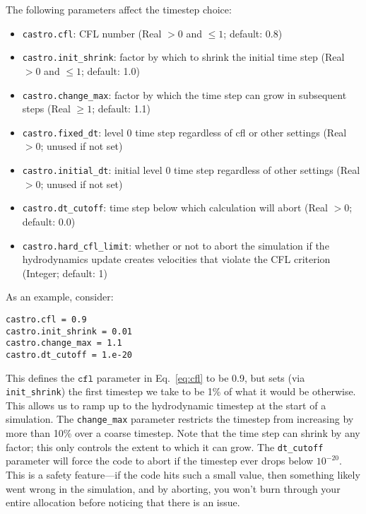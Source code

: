 The following parameters affect the timestep choice:
\begin{itemize}
\item {\tt castro.cfl}: CFL number (Real $> 0$ and $\leq 1$; default: 0.8)

\item {\tt castro.init\_shrink}: factor by which to shrink the initial
   time step (Real $> 0$ and $\leq 1$; default: 1.0)

\item {\tt castro.change\_max}: factor by which the time step can grow in
   subsequent steps (Real $\geq 1$; default: 1.1)

\item {\tt castro.fixed\_dt}: level 0 time step regardless of cfl or other settings
   (Real $> 0$; unused if not set)

\item {\tt castro.initial\_dt}: initial level 0 time
   step regardless of other settings (Real $> 0$;  unused if not set)

\item {\tt castro.dt\_cutoff}: time step below which calculation will abort
   (Real $> 0$; default: 0.0)

\item {\tt castro.hard\_cfl\_limit}: whether or not to abort the simulation if the hydrodynamics
   update creates velocities that violate the CFL criterion (Integer; default: 1)
\end{itemize}

As an example, consider:
\begin{lstlisting}
castro.cfl = 0.9 
castro.init_shrink = 0.01 
castro.change_max = 1.1
castro.dt_cutoff = 1.e-20
\end{lstlisting}
This defines the $\mathtt{cfl}$ parameter in Eq.~\ref{eq:cfl} to be 0.9,
but sets (via {\tt init\_shrink}) the first timestep we take
to be 1\% of what it would be otherwise.  This allows us to
ramp up to the hydrodynamic timestep at the start of a simulation.
The {\tt change\_max} parameter restricts the timestep from increasing
by more than 10\% over a coarse timestep.    Note that the time step
can shrink by any factor; this only controls the extent to which it can grow.
The {\tt dt\_cutoff} parameter will force the code to abort if the
timestep ever drops below $10^{-20}$.  This is a safety feature---if the
code hits such a small value, then something likely went wrong in the
simulation, and by aborting, you won't burn through your entire allocation
before noticing that there is an issue.

